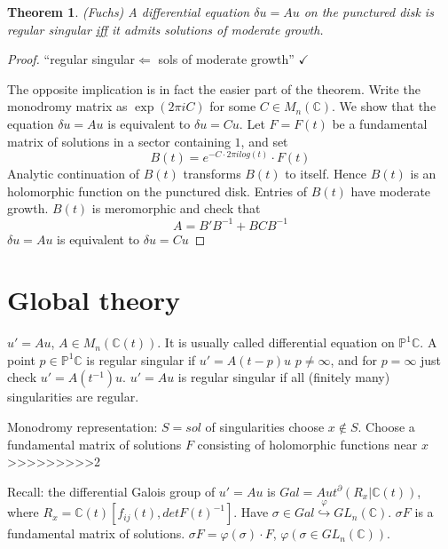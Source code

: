 \documentclass[11pt]{article}
\newtheorem{thm}{Theorem}[section]
\newcommand{\pd}{\partial}
\newcommand{\cplx}{\mathbb C}
\newcommand{\Llta}{\Longleftarrow}
\newcommand{\inj}{\hookrightarrow}
\begin{document}
\begin{thm}(Fuchs)
A differential equation $\delta u=Au$ on the punctured disk is regular singular \underline{iff} it admits solutions of moderate growth.
\end{thm}
\begin{proof}
``regular singular$\Llta$ sols of moderate growth'' $\checkmark$

The opposite implication is in fact the easier part of the theorem. Write the monodromy matrix as $\exp(2\pi i C)$ for some $C\in M_n(\cplx)$. We show that the equation $\delta u= Au$ is equivalent to $\delta u= Cu$. Let $F=F(t)$ be a fundamental matrix of solutions in a sector containing $1$, and set 
$$
B(t)=e^{-C\cdot 2\pi i log(t)}\cdot F(t)
$$
Analytic continuation of $B(t)$ transforms $B(t)$ to itself. Hence $B(t)$ is an holomorphic function on the punctured disk. Entries of $B(t)$ have moderate growth. $B(t)$ is meromorphic and check that
$$
A=B'B^{-1}+ B C B^{-1}
$$
$\delta u=A u$ is equivalent to $\delta u =C u$
\end{proof}
\section{Global theory}
$u'=A u$, $A\in M_n(\cplx(t))$. It is usually called differential equation on $\mathbb{P}^1\cplx$. A point $p\in \mathbb{P}^1\cplx$ is regular singular if $u'=A(t-p)u$ $p\neq \infty$, and for $p=\infty$ just check $u'=A(t^{-1})u$. $u'=A u$ is regular singular if all (finitely many) singularities are regular.

Monodromy representation: $S=sol$ of singularities choose $x\notin S$. Choose a fundamental matrix of solutions $F$ consisting of holomorphic functions near $x$
>>>>>>>>>2

Recall: the differential Galois group of $u'=Au$ is $Gal=Aut^\pd(R_x|\cplx(t))$, where $R_x=\cplx(t)[f_{ij}(t),det F(t)^{-1}]$. Have $\sigma\in Gal\overset{\varphi}{\inj} GL_n(\cplx)$. $\sigma F$ is a fundamental matrix of solutions. $\sigma F=\varphi(\sigma)\cdot F$, $\varphi(\sigma\in GL_n(\cplx))$. 
\end{document}
